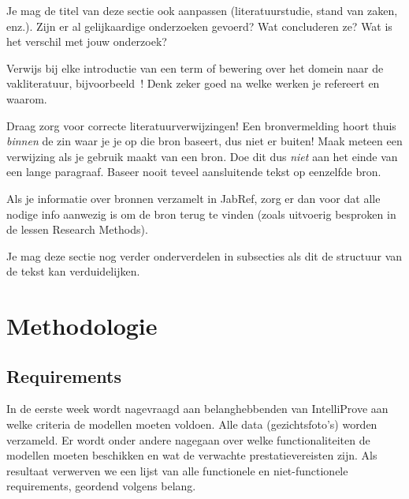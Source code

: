 Je mag de titel van deze sectie ook aanpassen (literatuurstudie, stand van zaken, enz.). Zijn er al gelijkaardige onderzoeken gevoerd? Wat concluderen ze? Wat is het verschil met jouw onderzoek?

Verwijs bij elke introductie van een term of bewering over het domein naar de vakliteratuur, bijvoorbeeld~\autocite{Hykes2013}! Denk zeker goed na welke werken je refereert en waarom.

Draag zorg voor correcte literatuurverwijzingen! Een bronvermelding hoort thuis \emph{binnen} de zin waar je je op die bron baseert, dus niet er buiten! Maak meteen een verwijzing als je gebruik maakt van een bron. Doe dit dus \emph{niet} aan het einde van een lange paragraaf. Baseer nooit teveel aansluitende tekst op eenzelfde bron.

Als je informatie over bronnen verzamelt in JabRef, zorg er dan voor dat alle nodige info aanwezig is om de bron terug te vinden (zoals uitvoerig besproken in de lessen Research Methods).


Je mag deze sectie nog verder onderverdelen in subsecties als dit de structuur van de tekst kan verduidelijken.

\section{Methodologie}%
\label{sec:methodologie}

\subsection{Requirements}
\label{sub:requirements}
In de eerste week wordt nagevraagd aan belanghebbenden van IntelliProve aan welke criteria de modellen moeten voldoen. Alle data (gezichtsfoto's) worden verzameld. Er wordt onder andere nagegaan over welke functionaliteiten de modellen moeten beschikken en wat de verwachte prestatievereisten zijn. 
Als resultaat verwerven we een lijst van alle functionele en niet-functionele requirements, geordend volgens belang. 

